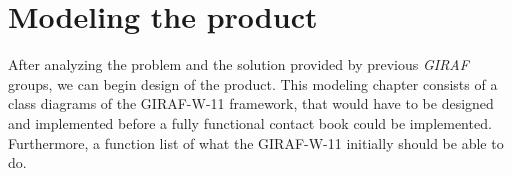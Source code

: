 \chapter{Modeling the product}
After analyzing the problem and the solution provided by previous \emph{GIRAF} groups, we can begin design of the product.
This modeling chapter consists of a class diagrams of the GIRAF-W-11 framework, that would have to be designed and implemented before a fully functional contact book could be implemented. Furthermore, a function list of what the GIRAF-W-11 initially should be able to do.
